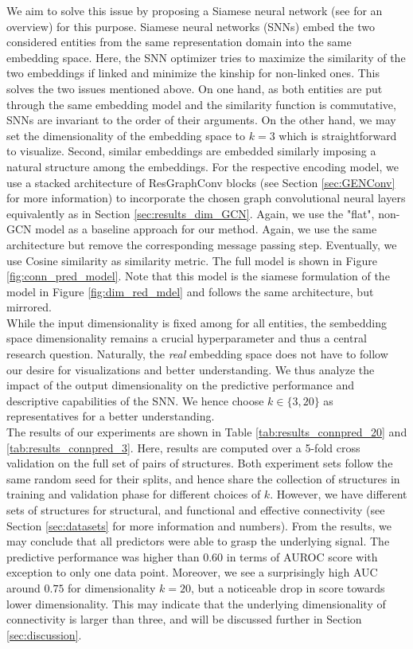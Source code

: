 \documentclass[]{article}
\renewcommand{\cite}{\citep}
\begin{document}
We aim to solve this issue by proposing a Siamese neural network\cite{bromley1993signature} (see \citet{chicco2021siamese} for an overview) for this purpose. Siamese neural networks (SNNs) embed the two considered entities from the same representation domain into the same embedding space. Here, the SNN optimizer tries to maximize the similarity of the two embeddings if linked and minimize the kinship for non-linked ones. This solves the two issues mentioned above. On one hand, as both entities are put through the same embedding model and the similarity function is commutative, SNNs are invariant to the order of their arguments. On the other hand, we may set the dimensionality of the embedding space to $k=3$ which is straightforward to visualize. Second, similar embeddings are embedded similarly imposing a natural structure among the embeddings. 
For the respective encoding model, we use a stacked architecture of ResGraphConv blocks (see Section \ref{sec:GENConv} for more information) to incorporate the chosen graph convolutional neural layers equivalently as in Section \ref{sec:results_dim_GCN}. Again, we use the "flat", non-GCN model as a baseline approach for our method. Again, we use the same architecture but remove the corresponding message passing step. Eventually, we use Cosine similarity as similarity metric.
The full model is shown in Figure \ref{fig:conn_pred_model}. Note that this model is the siamese formulation of the model in Figure \ref{fig:dim_red_mdel} and follows the same architecture, but mirrored.\\

While the input dimensionality is fixed among for all entities, the sembedding space dimensionality remains a crucial hyperparameter and thus a central research question. Naturally, the \textit{real} embedding space does not have to follow our desire for visualizations and better understanding. We thus analyze the impact of the output dimensionality on the predictive performance and descriptive capabilities of the SNN. We hence choose $k\in \{3,20\}$ as representatives for a better understanding.\\

The results of our experiments are shown in Table \ref{tab:results_connpred_20} and \ref{tab:results_connpred_3}. Here, results are computed over a 5-fold cross validation on the full set of pairs of structures. Both experiment sets follow the same random seed for their splits, and hence share the collection of structures in training and validation phase for different choices of $k$. However, we have different sets of structures for structural, and functional and effective connectivity (see Section \ref{sec:datasets} for more information and numbers). 
From the results, we may conclude that all predictors were able to grasp the underlying signal. The predictive performance was higher than $0.60$ in terms of AUROC score with exception to only one data point. Moreover, we see a surprisingly high AUC  around $0.75$ for dimensionality $k=20$, but a noticeable drop in score towards lower dimensionality. This may indicate that the underlying dimensionality of connectivity is larger than three, and will be discussed further in Section \ref{sec:discussion}.
\end{document}
